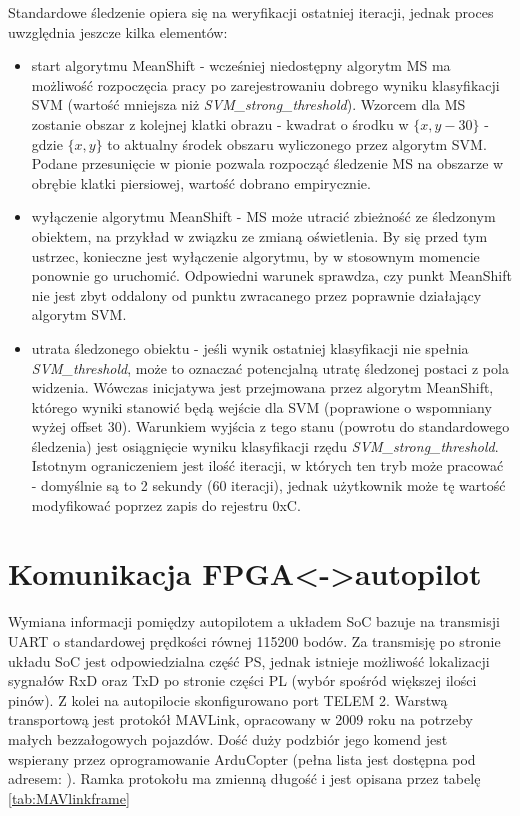 Standardowe śledzenie opiera się na weryfikacji ostatniej iteracji, jednak proces uwzględnia jeszcze kilka elementów:
\begin{itemize}
	\item start algorytmu MeanShift - wcześniej niedostępny algorytm MS ma możliwość rozpoczęcia pracy po zarejestrowaniu dobrego wyniku klasyfikacji SVM (wartość mniejsza niż \textit{SVM\_strong\_threshold}). Wzorcem dla MS zostanie obszar z kolejnej klatki obrazu - kwadrat o środku w $\{x,y-30\}$ - gdzie $\{x,y\}$ to aktualny środek obszaru wyliczonego przez algorytm SVM. Podane przesunięcie w pionie pozwala rozpocząć śledzenie MS na obszarze w obrębie klatki piersiowej, wartość dobrano empirycznie.
	\item wyłączenie algorytmu MeanShift - MS może utracić zbieżność ze śledzonym obiektem, na przykład w związku ze zmianą oświetlenia. By się przed tym ustrzec, konieczne jest wyłączenie algorytmu, by w stosownym momencie ponownie go uruchomić. Odpowiedni warunek sprawdza, czy punkt MeanShift nie jest zbyt oddalony od punktu zwracanego przez poprawnie działający algorytm SVM.
	\item utrata śledzonego obiektu - jeśli wynik ostatniej klasyfikacji nie spełnia \textit{SVM\_threshold}, może to oznaczać potencjalną utratę śledzonej postaci z pola widzenia. Wówczas inicjatywa jest przejmowana przez algorytm MeanShift, którego wyniki stanowić będą wejście dla SVM (poprawione o wspomniany wyżej offset $30$). Warunkiem wyjścia z tego stanu (powrotu do standardowego śledzenia) jest osiągnięcie wyniku klasyfikacji rzędu \textit{SVM\_strong\_threshold}. Istotnym ograniczeniem jest ilość iteracji, w których ten tryb może pracować - domyślnie są to 2 sekundy (60 iteracji), jednak użytkownik może tę wartość modyfikować poprzez zapis do rejestru 0xC.
\end{itemize} 

\section{Komunikacja FPGA<->autopilot}
Wymiana informacji pomiędzy autopilotem a układem SoC bazuje na transmisji UART o standardowej prędkości równej 115200 bodów. Za transmisję po stronie układu SoC jest odpowiedzialna część PS, jednak istnieje możliwość lokalizacji sygnałów RxD oraz TxD po stronie części PL (wybór spośród większej ilości pinów). Z kolei na autopilocie skonfigurowano port TELEM 2.
Warstwą transportową jest protokół MAVLink, opracowany w 2009 roku na potrzeby małych bezzałogowych pojazdów. Dość duży podzbiór jego komend jest wspierany przez oprogramowanie ArduCopter (pełna lista jest dostępna pod adresem: \cite{ArduCopterCmds}). Ramka protokołu ma zmienną długość i jest opisana przez tabelę \ref{tab:MAVlinkframe}

